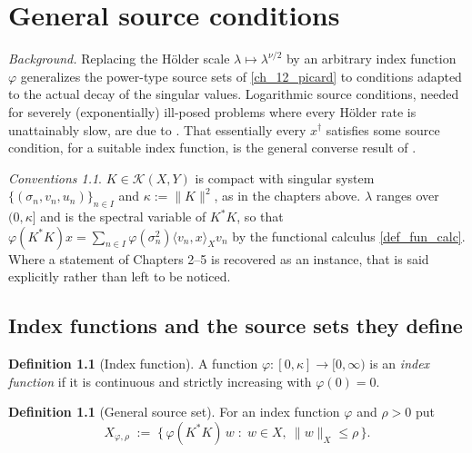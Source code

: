 \documentclass[a4paper]{report}
\theoremstyle{plain}
\theoremstyle{definition}
\newtheorem{definition}[theorem]{Definition}
\theoremstyle{remark}
\newtheorem{assumptions}[theorem]{Conventions}
\newcommand{\Kk}{\mathcal{K}}
\newcommand{\dg}{^{\dagger}}
\begin{document}
\chapter{General source conditions}
\label{ch_19_general_source_conditions}

\noindent\emph{Background.} Replacing the Hölder scale $\lambda \mapsto \lambda^{\nu/2}$
by an arbitrary index function $\varphi$ generalizes the power-type source sets of
\cref{ch_12_picard} to conditions adapted to the actual decay of the singular values.
Logarithmic source conditions, needed for severely (exponentially) ill-posed problems
where every Hölder rate is unattainably slow, are due to \citet{Hohage2000}. That
essentially every $x\dg$ satisfies some source condition, for a suitable index function,
is the general converse result of \citet{MatheHofmann2008}.

\begin{assumptions}
  \label{asm_general_source_conditions}
  $K \in \Kk(X,Y)$ is compact with singular system
$\{(\sigma_n,v_n,u_n)\}_{n \in I}$ and $\kappa := \|K\|^{2}$, as in the chapters above.
$\lambda$ ranges over $(0,\kappa]$ and is the spectral variable of $K^{*}K$, so that
$\varphi(K^{*}K)x = \sum_{n \in I}\varphi(\sigma_n^{2})\langle v_n,x\rangle_X v_n$ by the
functional calculus \cref{def_fun_calc}.  Where a statement of Chapters 2--5 is recovered as
an instance, that is said explicitly rather than left to be noticed.
\end{assumptions}

\section{Index functions and the source sets they define}

\begin{definition}[Index function]
  \label{def_index_function}
  A function $\varphi \colon [0,\kappa] \to [0,\infty)$ is an \emph{index function} if it
  is continuous and strictly increasing with $\varphi(0) = 0$.
\end{definition}


\begin{definition}[General source set]
  \label{def_general_source}
  For an index function $\varphi$ and $\rho > 0$ put
  \[
    X_{\varphi,\rho} \;:=\; \{\, \varphi(K^{*}K)\,w \;:\; w \in X,\ \|w\|_X \le \rho \,\} .
  \]
\end{definition}
\end{document}
